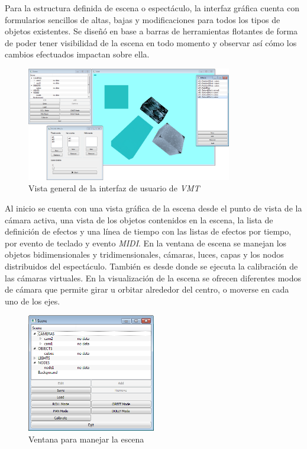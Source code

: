 Para la estructura definida de escena o espectáculo, la interfaz gráfica cuenta con formularios sencillos de altas, bajas y modificaciones para todos los tipos de objetos existentes. Se diseñó en base a barras de herramientas flotantes de forma de poder tener visibilidad de la escena en todo momento y observar así cómo los cambios efectuados impactan sobre ella.

\begin{figure}[H]
  \centering
    \includegraphics[width=0.8\textwidth]{./Cap5_vmt/vmt_todo.png}
  \caption{Vista general de la interfaz de usuario de \emph{VMT}}
  \label{fig:VMT-MainWindow}
\end{figure}

Al inicio se cuenta con una vista gráfica de la escena desde el punto de vista de la cámara activa, una vista de los objetos contenidos en la escena, la lista de definición de efectos y una línea de tiempo con las listas de efectos por tiempo, por evento de teclado y evento \emph{MIDI}.
En la ventana de escena se manejan los objetos bidimensionales y tridimensionales, cámaras, luces, capas y los nodos distribuidos del espectáculo. También es desde donde se ejecuta la calibración de las cámaras virtuales. En la visualización de la escena se ofrecen diferentes modos de cámara que permite girar u orbitar alrededor del centro, o moverse en cada uno de los ejes.

\begin{figure}[H]
  \centering
    \includegraphics[width=0.5\textwidth]{./Cap5_vmt/vmt_scene.png}
  \caption{Ventana para manejar la escena}
  \label{fig:VMT-SceneWindow}
\end{figure}

